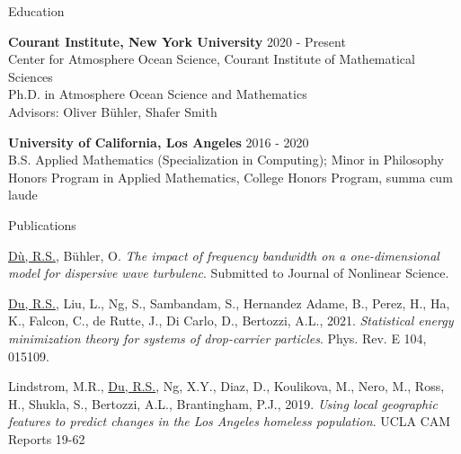 \documentclass{resume} %
\begin{document}

\begin{rSection}{Education}

{\bf Courant Institute, New York University} \hfill {2020 - Present} \\
Center for Atmosphere Ocean Science, Courant Institute of Mathematical Sciences\\
Ph.D. in Atmosphere Ocean Science and Mathematics\\
Advisors: Oliver B\"uhler, Shafer Smith

{\bf University of California, Los Angeles} \hfill {2016 - 2020} \\
B.S. Applied Mathematics (Specialization in Computing); Minor in Philosophy\\
Honors Program in Applied Mathematics, College Honors Program, summa cum laude


\end{rSection}


\begin{rSection}{Publications}
\begin{etaremune}
    \item \underline{D\`u, R.S.}, B\"uhler, O. \textit{The impact of frequency bandwidth on a one-dimensional model for dispersive wave turbulenc}. Submitted to Journal of Nonlinear Science.
    \item \underline{Du, R.S.}, Liu, L., Ng, S., Sambandam, S., Hernandez Adame, B., Perez, H., Ha, K., Falcon, C., de Rutte, J., Di Carlo, D., Bertozzi, A.L., 2021. \textit{Statistical energy minimization theory for systems of drop-carrier particles}. Phys. Rev. E 104, 015109.
    \item Lindstrom, M.R., \underline{Du, R.S.}, Ng, X.Y., Diaz, D., Koulikova, M., Nero, M., Ross, H., Shukla, S., Bertozzi, A.L., Brantingham, P.J., 2019. \textit{Using local geographic features to predict changes in the Los Angeles homeless population}. UCLA CAM Reports 19-62
\end{etaremune}
\end{rSection}
\end{document}
